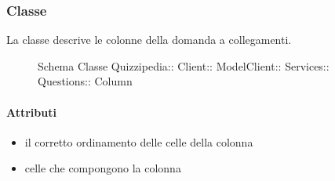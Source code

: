 \subsubsection{Classe }
La classe descrive le colonne della domanda a collegamenti.
\begin{figure}[H]
\centering
\noindent{}
\caption[Schema Classe Column]{Schema Classe Quizzipedia:: Client:: ModelClient:: Services:: Questions:: Column}
\end{figure}
\paragraph{Attributi}
\begin{itemize}
\item {}
\newline
il corretto ordinamento delle celle della colonna
\item {}
\newline
celle che compongono la colonna
\end{itemize}

